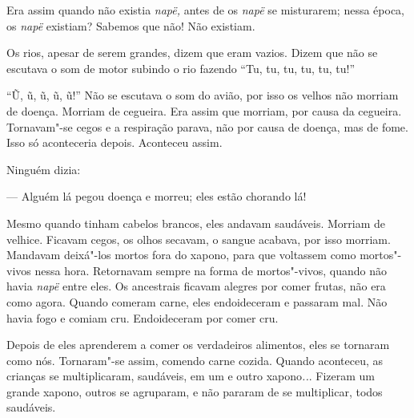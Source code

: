 Era assim quando não existia \emph{napë,} antes de os \emph{napë} se
misturarem; nessa época, os \emph{napë} existiam? Sabemos que não! Não
existiam. 

Os rios, apesar de serem grandes, dizem que eram vazios. Dizem que não
se escutava o som de motor subindo o rio fazendo ``Tu, tu, tu, tu, tu,
tu!''

``Ũ, ũ, ũ, ũ, ũ!'' Não se escutava o som do avião, por isso os velhos
não morriam de doença. Morriam de cegueira. Era assim que morriam, por
causa da cegueira. Tornavam"-se cegos e a respiração parava, não por
causa de doença, mas de fome. Isso só aconteceria depois. Aconteceu
assim. 

Ninguém dizia:

--- Alguém lá pegou doença e morreu; eles estão chorando lá! 

Mesmo quando tinham cabelos brancos, eles andavam saudáveis. Morriam de
velhice. Ficavam cegos, os olhos secavam, o sangue acabava, por isso
morriam. Mandavam deixá"-los mortos fora do xapono, para que voltassem
como mortos"-vivos nessa hora. Retornavam sempre na forma de
mortos"-vivos, quando não havia \emph{napë} entre eles. Os ancestrais
ficavam alegres por comer frutas, não era como agora. Quando comeram
carne, eles endoideceram e passaram mal. Não havia fogo e comiam cru.
Endoideceram por comer cru.

Depois de eles aprenderem a comer os verdadeiros alimentos, eles se
tornaram como nós. Tornaram"-se assim, comendo carne cozida. Quando
aconteceu, as crianças se multiplicaram, saudáveis, em um e outro
xapono\emph{..}. Fizeram um grande xapono, outros se agruparam, e não
pararam de se multiplicar, todos saudáveis.

 
